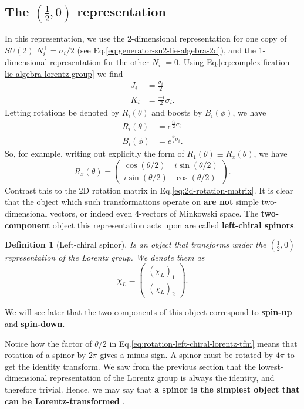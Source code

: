 \documentclass[11pt]{article}
\numberwithin{equation}{section}
\newtheorem{defn}{Definition}[section]
\begin{document}
\subsection{The $(\frac{1}{2},0)$ representation}
In this representation, we use the 2-dimensional representation for one copy of $SU(2)$ $N_i^+ = \sigma_i/2$ (see Eq.\eqref{eq:generator-su2-lie-algebra-2d}), and the 1-dimensional representation for the other $N_i^-=0$. Using Eq.\eqref{eq:complexification-lie-algebra-lorentz-group} we find
\begin{align}
J_i &= \frac{\sigma_i}{2} \\
K_i &= \frac{-i}{2} \sigma_i.
\end{align}
Letting rotations be denoted by $R_i(\theta)$ and boosts by $B_i(\phi)$, we have
\begin{align}
R_i(\theta) &= e^{\frac{i \theta}{2}  \sigma_i} \\
B_i(\phi) &= e^{\frac{\phi}{2}  \sigma_i}.
\end{align}
So, for example, writing out explicitly the form of $R_1(\theta) \equiv R_x(\theta)$, we have
\begin{equation}
R_x(\theta) = \begin{pmatrix}
\cos(\theta/2) & i \sin(\theta/2) \\
i \sin(\theta/2) & \cos(\theta/2)
\end{pmatrix}. \label{eq:rotation-left-chiral-lorentz-tfm}
\end{equation}
Contrast this to the 2D rotation matrix in Eq.\eqref{eq:2d-rotation-matrix}. It is clear that the object which such transformations operate on \textbf{are not} simple two-dimensional vectors, or indeed even 4-vectors of Minkowski space. The \textbf{two-component} object  this representation acts upon are called \textbf{left-chiral spinors}.
\begin{defn}[Left-chiral spinor]
Is an object that transforms under the $(\frac{1}{2},0)$ representation of the Lorentz group. We denote them as 
\begin{equation}
\chi_L = \begin{pmatrix}
(\chi_L)_1 \\
(\chi_L)_2 
\end{pmatrix}.
\end{equation}
\end{defn}
\noindent We will see later that the two components of this object correspond to \textbf{spin-up} and \textbf{spin-down}. 

Notice how the factor of $\theta/2$ in Eq.\eqref{eq:rotation-left-chiral-lorentz-tfm} means that rotation of a spinor by $2\pi$ gives a minus sign. A spinor must be rotated by $4\pi$ to get the identity transform. We saw from the previous section that the lowest-dimensional representation of the Lorentz group is always the identity, and therefore trivial. Hence, we may say that \textbf{a spinor is the simplest object that can be Lorentz-transformed} \citep{Steane13}.
\end{document}
